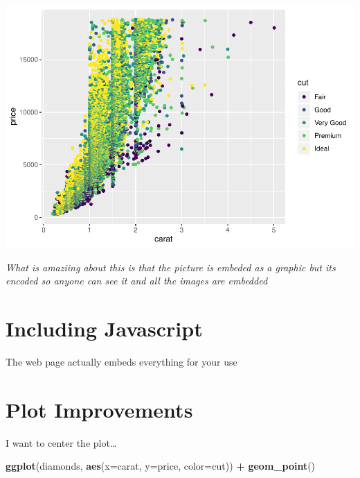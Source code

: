 \documentclass[]{article}
\newenvironment{Shaded}{\begin{snugshade}}{\end{snugshade}}
\newcommand{\DataTypeTok}[1]{\textcolor[rgb]{0.13,0.29,0.53}{#1}}
\newcommand{\KeywordTok}[1]{\textcolor[rgb]{0.13,0.29,0.53}{\textbf{#1}}}
\newcommand{\NormalTok}[1]{#1}
\newcommand{\OperatorTok}[1]{\textcolor[rgb]{0.81,0.36,0.00}{\textbf{#1}}}
\newcommand{\StringTok}[1]{\textcolor[rgb]{0.31,0.60,0.02}{#1}}
\begin{document}
\begin{center}\includegraphics{rmarkdown_primer_ec_files/figure-latex/unnamed-chunk-4-1} \end{center}

\emph{What is amaziing about this is that the picture is embeded as a
graphic but its encoded so anyone can see it and all the images are
embedded}

\hypertarget{including-javascript}{%
\section{Including Javascript}\label{including-javascript}}

The web page actually embeds everything for your use

\hypertarget{plot-improvements}{%
\section{Plot Improvements}\label{plot-improvements}}

I want to center the plot\ldots{}

\begin{Shaded}
\begin{Highlighting}[]
\KeywordTok{ggplot}\NormalTok{(diamonds, }\KeywordTok{aes}\NormalTok{(}\DataTypeTok{x=}\NormalTok{carat, }\DataTypeTok{y=}\NormalTok{price, }\DataTypeTok{color=}\NormalTok{cut)) }\OperatorTok{+}\StringTok{ }\KeywordTok{geom_point}\NormalTok{()}
\end{Highlighting}
\end{Shaded}
\end{document}
